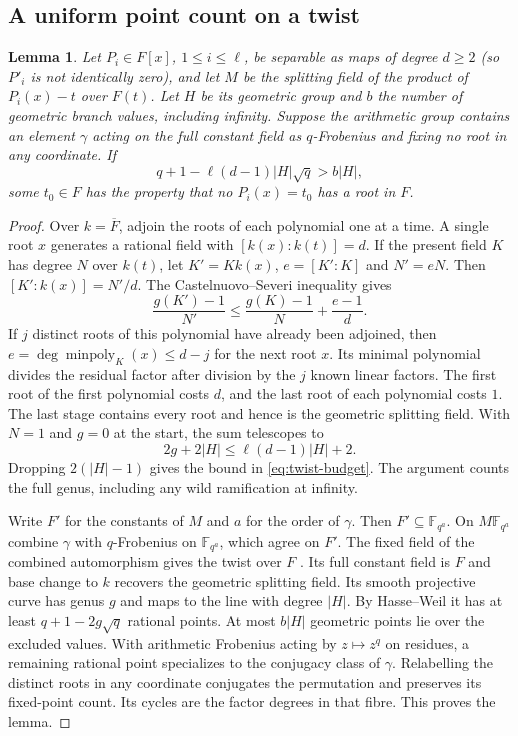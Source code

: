 \documentclass[preprint,12pt,numbers]{elsarticle}
\newtheorem{lemma}[theorem]{Lemma}
\begin{document}
\subsection{A uniform point count on a twist}
\begin{lemma}\label{lem:twist}
Let $P_i\in F[x]$, $1\le i\le\ell$, be separable as maps of degree
$d\ge2$ (so $P'_i$ is not identically zero), and let $M$ be the
splitting field of the product of $P_i(x)-t$ over $F(t)$.
Let $H$ be its geometric group and $b$ the number of geometric
branch values, including infinity. Suppose the arithmetic group
contains an element $\gamma$ acting on the full constant field as
$q$-Frobenius and fixing no root in any coordinate. If
\begin{equation}\label{eq:twist-budget}
 q+1-\ell(d-1)|H|\sqrt q>b|H|,
\end{equation}
some $t_0\in F$ has the property that no $P_i(x)=t_0$ has a root in $F$.
\end{lemma}
\begin{proof}
Over $k=\overline F$, adjoin the roots of each polynomial one at a
time. A single root $x$ generates a rational field with
$[k(x):k(t)]=d$. If the present field $K$ has degree $N$ over $k(t)$,
let $K'=Kk(x)$, $e=[K':K]$ and $N'=eN$. Then
$[K':k(x)]=N'/d$. The Castelnuovo--Severi inequality
\cite[Thm.~3.11.3]{Stichtenoth} gives
\[
 \frac{g(K')-1}{N'}\le\frac{g(K)-1}{N}+\frac{e-1}{d}.
\]
If $j$ distinct roots of this polynomial have already been adjoined,
then $e=\deg\operatorname{minpoly}_{K}(x)\le d-j$ for the next root $x$. Its minimal
polynomial divides the residual factor after division by the $j$
known linear factors. The first root of the first polynomial costs
$d$, and the last root of each polynomial costs $1$. The last
stage contains every root and hence is the geometric
splitting field.
With $N=1$ and $g=0$ at the start, the sum telescopes to
\[
        2g+2|H|\le\ell(d-1)|H|+2 .
\]
Dropping $2(|H|-1)$ gives the bound in \eqref{eq:twist-budget}.
The argument counts the full genus, including any wild ramification at infinity.

Write $F'$ for the constants of $M$ and $a$ for the order of
$\gamma$. Then $F'\subseteq\mathbb F_{q^a}$. On $M\mathbb F_{q^a}$
combine $\gamma$ with $q$-Frobenius on $\mathbb F_{q^a}$, which
agree on $F'$. The fixed field of the combined automorphism gives
the twist over $F$ \cite[Thm.~2]{Kosters}. Its full constant field
is $F$ and base change to $k$ recovers the geometric splitting
field. Its smooth projective curve has genus $g$ and maps to the
line with degree $|H|$. By Hasse--Weil it has at least
$q+1-2g\sqrt q$ rational points. At most $b|H|$ geometric points lie
over the excluded values. With arithmetic Frobenius acting by
$z\mapsto z^q$ on residues, a remaining rational point specializes
to the conjugacy class of $\gamma$. Relabelling the distinct roots
in any coordinate conjugates the permutation and preserves its
fixed-point count. Its cycles are the factor degrees in that fibre. This
proves the lemma.
\end{proof}
\end{document}
